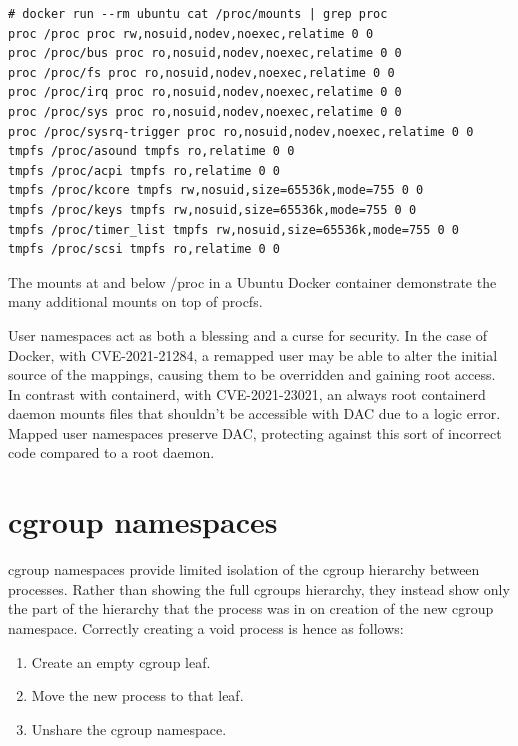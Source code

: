 \documentclass[12pt,a4paper,twoside]{report}
\begin{document}
\begin{listing}
\begin{verbatim}
# docker run --rm ubuntu cat /proc/mounts | grep proc
proc /proc proc rw,nosuid,nodev,noexec,relatime 0 0
proc /proc/bus proc ro,nosuid,nodev,noexec,relatime 0 0
proc /proc/fs proc ro,nosuid,nodev,noexec,relatime 0 0
proc /proc/irq proc ro,nosuid,nodev,noexec,relatime 0 0
proc /proc/sys proc ro,nosuid,nodev,noexec,relatime 0 0
proc /proc/sysrq-trigger proc ro,nosuid,nodev,noexec,relatime 0 0
tmpfs /proc/asound tmpfs ro,relatime 0 0
tmpfs /proc/acpi tmpfs ro,relatime 0 0
tmpfs /proc/kcore tmpfs rw,nosuid,size=65536k,mode=755 0 0
tmpfs /proc/keys tmpfs rw,nosuid,size=65536k,mode=755 0 0
tmpfs /proc/timer_list tmpfs rw,nosuid,size=65536k,mode=755 0 0
tmpfs /proc/scsi tmpfs ro,relatime 0 0
\end{verbatim}

\caption{The mounts at and below /proc in a Ubuntu Docker container demonstrate the many additional mounts on top of procfs.}
\label{lst:docker-procfs}
\end{listing}

User namespaces act as both a blessing and a curse for security. In the case of Docker, with CVE-2021-21284, a remapped user may be able to alter the initial source of the mappings, causing them to be overridden and gaining root access. In contrast with containerd, with CVE-2021-23021, an always root containerd daemon mounts files that shouldn't be accessible with DAC due to a logic error. Mapped user namespaces preserve DAC, protecting against this sort of incorrect code compared to a root daemon.

\section{cgroup namespaces}
\label{sec:voiding-cgroup}

cgroup namespaces provide limited isolation of the cgroup hierarchy between processes. Rather than showing the full cgroups hierarchy, they instead show only the part of the hierarchy that the process was in on creation of the new cgroup namespace. Correctly creating a void process is hence as follows:

\begin{enumerate}
    \item Create an empty cgroup leaf.
    \item Move the new process to that leaf.
    \item Unshare the cgroup namespace.
\end{enumerate}
\end{document}
